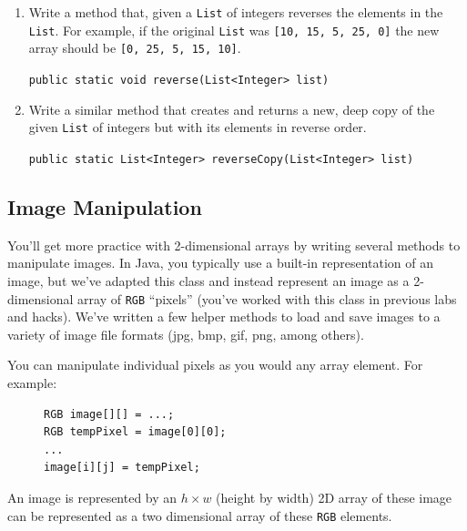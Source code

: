\documentclass[12pt]{scrartcl}
\begin{document}
\begin{enumerate}
  \item Write a method that, given a \texttt{List} of integers 
  reverses the elements in the \texttt{List}.  For example, if 
  the original \texttt{List} was \texttt{[10, 15, 5, 25, 0]} 
  the new array should be 
  \texttt{[0, 25, 5, 15, 10]}.
  
  \texttt{public static void reverse(List<Integer> list)}

  \item Write a similar method that creates and returns a new, deep copy of 
  the given \texttt{List} of integers but with its elements in reverse order. 
  
  \texttt{public static List<Integer> reverseCopy(List<Integer> list)}

\end{enumerate}

\subsection*{Image Manipulation}

You'll get more practice with 2-dimensional arrays by writing several
methods to manipulate images.  In Java, you typically use a built-in
representation of an image, but we've adapted this class and instead
represent an image as a 2-dimensional array of \texttt{RGB}
``pixels'' (you've worked with this class in previous labs and hacks).  
We've written a few helper methods to load and save images to a variety 
of image file formats (jpg, bmp, gif, png, among others).  

You can manipulate individual pixels as you would any array element.  
For example:

\begin{figure}[H]
\begin{verbatim}
RGB image[][] = ...;
RGB tempPixel = image[0][0];
...
image[i][j] = tempPixel;
\end{verbatim} 
\end{figure}

An image is represented by an $h \times w$ (height by width) 2D array
of these image can be represented as a two dimensional
array of these \texttt{RGB} elements.  
\end{document}
